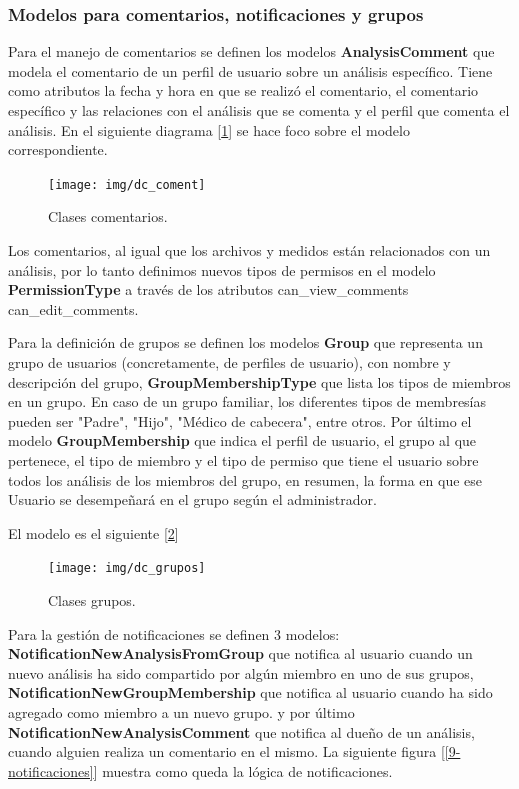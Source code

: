 \subsubsection{Modelos para comentarios, notificaciones y grupos}

Para el manejo de comentarios se definen los modelos \textbf{AnalysisComment} que modela el comentario de un perfil de usuario sobre un análisis específico. Tiene como atributos la fecha y hora en que se realizó el comentario, el comentario específico y las relaciones con el análisis que se comenta y el perfil que comenta el análisis. En el siguiente diagrama [\ref{9-comentario_análisis}] se hace foco sobre el modelo correspondiente.

	\begin{figure}[h]
        \centering
        \texttt{[image: img/dc\_coment]}
        \caption{Clases comentarios.}
		\label{9-comentario_análisis}
    \end{figure}

Los comentarios, al igual que los archivos y medidos están relacionados con un análisis, por lo tanto definimos nuevos tipos de permisos en el modelo \textbf{PermissionType} a través de los atributos can\_view\_comments can\_edit\_comments.

Para la definición de grupos se definen los modelos \textbf{Group} que representa un grupo de usuarios (concretamente, de perfiles de usuario), con nombre y descripción del grupo, \textbf{GroupMembershipType} que lista los tipos de miembros en un grupo. En caso de un grupo familiar, los diferentes tipos de membresías pueden ser "Padre", "Hijo", "Médico de cabecera", entre otros. Por último el modelo \textbf{GroupMembership} que indica el perfil de usuario, el grupo al que pertenece, el tipo de miembro y el tipo de permiso que tiene el usuario sobre todos los análisis de los miembros del grupo, en resumen, la forma en que ese Usuario se desempeñará en el grupo según el administrador. 

El modelo es el siguiente [\ref{9-grupo}]
\newpage
	\begin{figure}[h]
        \centering
        \texttt{[image: img/dc\_grupos]}
        \caption{Clases grupos.}
		\label{9-grupo}
    \end{figure}

Para la gestión de notificaciones se definen 3 modelos: \textbf{NotificationNewAnalysisFromGroup} que notifica al usuario cuando un nuevo análisis ha sido compartido por algún miembro en uno de sus grupos, \textbf{NotificationNewGroupMembership} que notifica al usuario cuando ha sido agregado como miembro a un nuevo grupo. y por último \textbf{NotificationNewAnalysisComment}  que notifica al dueño de un análisis, cuando alguien realiza un comentario en el mismo. La siguiente figura [\ref{9-notificaciones}] muestra como queda la lógica de notificaciones. 


